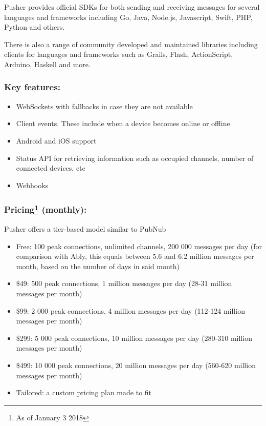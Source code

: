 Pusher provides official SDKs for both sending and receiving messages for several languages and frameworks including Go, Java, Node.js, Javascript, Swift, PHP, Python and others\cite{pusher-libs}. 

There is also a range of community developed and maintained libraries including clients for languages and frameworks such as Grails, Flash, ActionScript, Arduino, Haskell and more\cite{pusher-libs2}.

\subsubsection*{Key features:}
\begin{itemize}
\item WebSockets with fallbacks in case they are not available
\item Client events. These include when a device becomes online or offline
\item Android and iOS support
\item Status API for retrieving information such as occupied channels, number of connected devices, etc\cite{pusher-query}
\item Webhooks
\end{itemize}

\subsubsection*{Pricing\footnote{As of January 3 2018} (monthly):}

Pusher offers a tier-based model similar to PubNub

\begin{itemize}
\item Free: 100 peak connections, unlimited channels, 200 000 messages per day (for comparison with Ably, this equals between 5.6 and 6.2 million messages per month, based on the number of days in said month)
\item \$49: 500 peak connections, 1 million messages per day (28-31 million messages per month)
\item \$99: 2 000 peak connections, 4 million messages per day (112-124 million messages per month)
\item \$299: 5 000 peak connections, 10 million messages per day (280-310 million messages per month)
\item \$499: 10 000 peak connections, 20 million messages per day (560-620 million messages per month)
\item Tailored: a custom pricing plan made to fit
\end{itemize}

